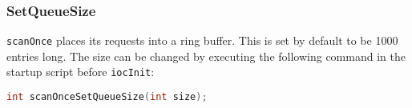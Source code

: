\subsubsection{SetQueueSize}

\verb|scanOnce| places its requests into a ring buffer.
This is set by default to be 1000 entries long.
The size can be changed by executing the following command in the startup script before \verb|iocInit|:

\begin{lstlisting}[language=C]
int scanOnceSetQueueSize(int size);
\end{lstlisting}

